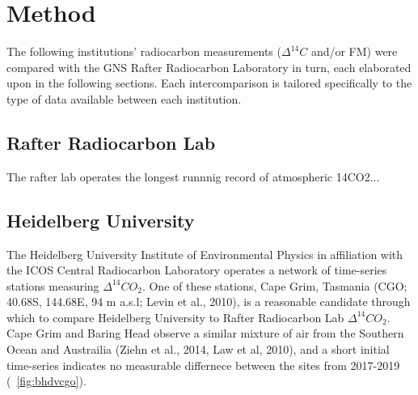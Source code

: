 \section{Method}
\label{sec:method}


The following institutions' radiocarbon measurements (${\Delta^{14}C}$ and/or FM) 
 were compared with the GNS Rafter Radiocarbon Laboratory in turn, each elaborated upon in the following sections. Each intercomparison is tailored specifically to the type of data available between each institution. 

\subsection{Rafter Radiocarbon Lab}

The rafter lab operates the longest runnnig record of atmospheric 14CO2...

\subsection{Heidelberg University}

The Heidelberg University Institute of Environmental Physics in affiliation with the ICOS Central Radiocarbon Laboratory operates a network of time-series stations measuring ${\Delta^{14}CO_{2}}$. One of these stations, Cape Grim, Tasmania (CGO; 40.68S, 144.68E, 94 m a.s.l; Levin et al., 2010), is a reasonable candidate through which to compare Heidelberg University to Rafter Radiocarbon Lab ${\Delta^{14}CO_{2}}$. Cape Grim and Baring Head observe a similar mixture of air from the Southern Ocean and Austrailia (Ziehn et al., 2014, Law et al, 2010), and a short initial time-series indicates no measurable differnece between the sites from 2017-2019 (~\ref{fig:bhdvcgo}). 

